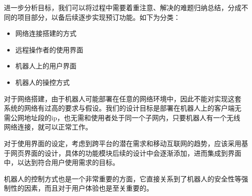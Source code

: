 
进一步分析目标，我们可以将过程中需要着重注意、解决的难题归纳总结，分成不同的项目部分，以备后续逐步实现预订功能。如下为分类：

\begin{itemize} \tightlist
\item 网络连接搭建的方式

\item 远程操作者的使用界面

\item 机器人上的用户界面

\item 机器人的操控方式

\end{itemize}




对于网络搭建，由于机器人可能部署在任意的网络环境中，因此不能对实现这套
系统的网络有过高的要求与假设。我们的设计目标是部署在机器人上的客户端无
需公网地址段的ip，也无需和使用者处于同一个子网内，只要机器人有一个无线
网络连接，就可以正常工作。

对于使用界面的设定，考虑到跨平台的潜在需求和移动互联网的趋势，应该采用基于网页界面的设计，具体的功能模块后续的设计中会逐渐添加，进而集成到界面中，以达到符合用户使用需求的目标。

机器人的控制方式也是一个非常重要的方面，它直接关系到了机器人的安全性等强制性的因素，而且对于用户体验也是至关重要的。


